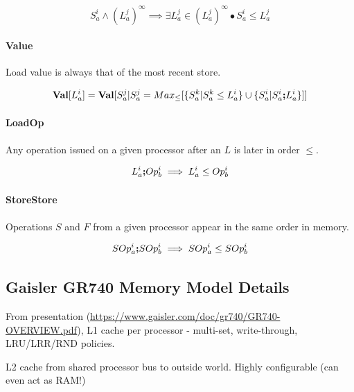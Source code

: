 \begin{equation*}
   S_a^i \land (L_a^j)^\infty
   \implies
   \exists L_a^j \in (L_a^j)^\infty
   \bullet
   S_a^i \leq L_a^j
\end{equation*}

\paragraph{Value}

Load value is always that of the most recent store.

\begin{equation*}
   \textbf{Val}[L_a^i]
   =
   \textbf{Val}
      [ S_a^j
        |
        S_a^j
        =
        Max_{\leq}
          [ \{{S_a^k | S_a^k \leq L_a^i}\}
            \cup
            \{{S_a^i | S_a^i \textbf{;} L_a^i}\}
          ]
      ]
\end{equation*}

\paragraph{LoadOp}

Any operation issued on a given processor after an $L$
is later in order $\leq$.

\begin{equation*}
   L_a^i \textbf{;} Op_b^i
   \implies
   L_a^i \leq Op_b^i
\end{equation*}

\paragraph{StoreStore}

Operations $S$ and $F$ from a given processor
appear in the same order in memory.

\begin{equation*}
   SOp_a^i \textbf{;} SOp_b^i
   \implies
   SOp_a^i \leq SOp_b^i
\end{equation*}


\subsection{Gaisler GR740 Memory Model Details}

From presentation (\url{https://www.gaisler.com/doc/gr740/GR740-OVERVIEW.pdf}),
 L1 cache per processor
- multi-set, write-through, LRU/LRR/RND policies.

L2 cache from shared processor bus to outside world.
Highly configurable (can even act as RAM!)

